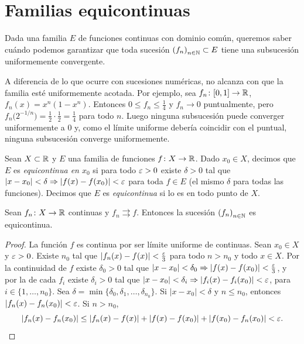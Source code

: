 \section{Familias equicontinuas}

Dada una familia \(E\) de funciones continuas con dominio común, queremos saber cuándo podemos garantizar que toda sucesión \({(f_n)}_{n \in \mathbb{N}} \subset E\) tiene una subsucesión uniformemente convergente.

A diferencia de lo que ocurre con sucesiones numéricas, no alcanza con que la familia esté uniformemente acotada. Por ejemplo, sea \(f_n\colon [0, 1] \to \mathbb{R}\), \(f_n(x) = x^n (1 - x^n)\). Entonces \(0 \leq f_n \leq \frac{1}{4}\) y \(f_n \to 0\) puntualmente, pero \(f_n \bigl( 2^{-1/n} \bigr) = \frac{1}{2} \cdot \frac{1}{2} = \frac{1}{4}\) para todo \(n\). Luego ninguna subsucesión puede converger uniformemente a \(0\) y, como el límite uniforme debería coincidir con el puntual, ninguna subsucesión converge uniformemente.

\begin{definition}[Equicontinuidad]
  Sean \(X \subset \mathbb{R}\) y \(E\) una familia de funciones \(f\colon X \to \mathbb{R}\). Dado \(x_0 \in X\), decimos que \(E\) es \emph{equicontinua en \(x_0\)} si para todo \(\varepsilon > 0\) existe \(\delta > 0\) tal que \(|x - x_0| < \delta \Rightarrow |f(x) - f(x_0)| < \varepsilon\) para toda \(f \in E\) (el mismo \(\delta\) para todas las funciones). Decimos que \(E\) es \emph{equicontinua} si lo es en todo punto de \(X\).
\end{definition}

\begin{theorem}
  Sean \(f_n\colon X \to \mathbb{R}\) continuas y \(f_n \rightrightarrows f\). Entonces la sucesión \({(f_n)}_{n \in \mathbb{N}}\) es equicontinua.
\end{theorem}

\begin{proof}
  La función \(f\) es continua por ser límite uniforme de continuas. Sean \(x_0 \in X\) y \(\varepsilon > 0\). Existe \(n_0\) tal que \(|f_n(x) - f(x)| < \frac{\varepsilon}{3}\) para todo \(n > n_0\) y todo \(x \in X\). Por la continuidad de \(f\) existe \(\delta_0 > 0\) tal que \(|x - x_0| < \delta_0 \Rightarrow |f(x) - f(x_0)| < \frac{\varepsilon}{3}\), y por la de cada \(f_i\) existe \(\delta_i > 0\) tal que \(|x - x_0| < \delta_i \Rightarrow |f_i(x) - f_i(x_0)| < \varepsilon\), para \(i \in \{1, \dots, n_0\}\). Sea \(\delta = \min\{ \delta_0, \delta_1, \dots, \delta_{n_0} \}\). Si \(|x - x_0| < \delta\) y \(n \leq n_0\), entonces \(|f_n(x) - f_n(x_0)| < \varepsilon\). Si \(n > n_0\),
  \[
    |f_n(x) - f_n(x_0)| \leq |f_n(x) - f(x)| + |f(x) - f(x_0)| + |f(x_0) - f_n(x_0)| < \varepsilon. \qedhere
  \]
\end{proof}

